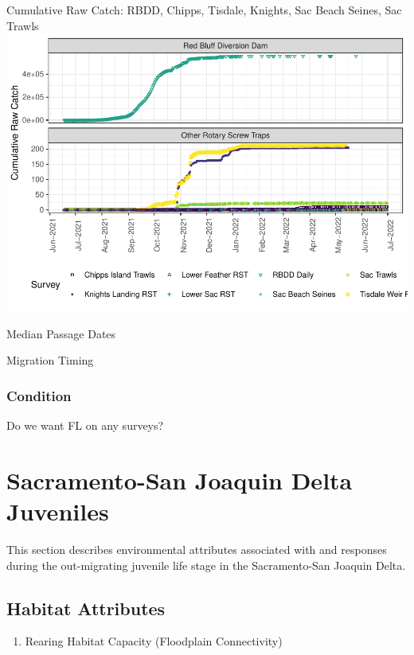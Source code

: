 \documentclass[
]{book}
\providecommand{\tightlist}{%
  \setlength{\itemsep}{0pt}\setlength{\parskip}{0pt}}
\theoremstyle{definition}
\theoremstyle{definition}
\theoremstyle{definition}
\theoremstyle{definition}
\theoremstyle{remark}
\begin{document}
Cumulative Raw Catch: RBDD, Chipps, Tisdale, Knights, Sac Beach Seines, Sac Trawls
\includegraphics{_main_files/figure-latex/juvtiming-fig-1.pdf}

Median Passage Dates

Migration Timing

\hypertarget{condition-1}{%
\subsection{Condition}\label{condition-1}}

Do we want FL on any surveys?

\hypertarget{sacramento-san-joaquin-delta-juveniles}{%
\chapter{Sacramento-San Joaquin Delta Juveniles}\label{sacramento-san-joaquin-delta-juveniles}}

This section describes environmental attributes associated with and responses during the out-migrating juvenile life stage in the Sacramento-San Joaquin Delta.

\hypertarget{habitat-attributes-3}{%
\section{Habitat Attributes}\label{habitat-attributes-3}}

\begin{enumerate}
\def\labelenumi{\arabic{enumi}.}
\tightlist
\item
  Rearing Habitat Capacity (Floodplain Connectivity)
\end{enumerate}
\end{document}
